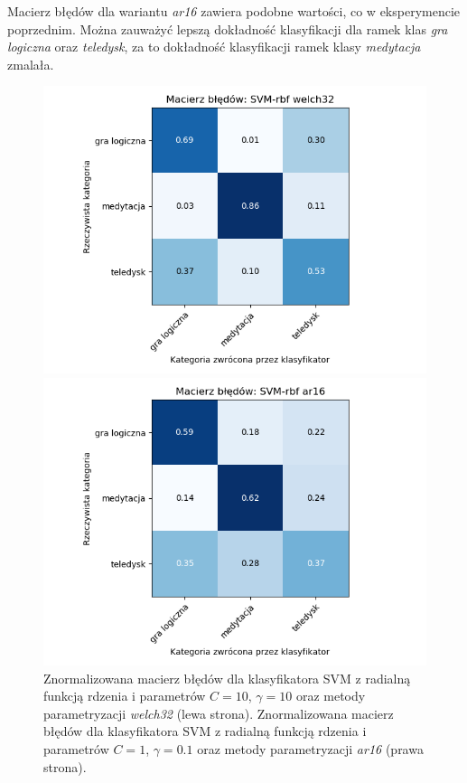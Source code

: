 \documentclass[notitlepage]{report}
\begin{document}
Macierz błędów dla wariantu \textit{ar16} zawiera podobne wartości, co w eksperymencie poprzednim. Można zauważyć lepszą dokładność klasyfikacji dla ramek klas \textit{gra logiczna} oraz \textit{teledysk}, za to dokładność klasyfikacji ramek klasy \textit{medytacja} zmalała.

\begin{figure}[H]
	\begin{minipage}{0.48\textwidth}
		\centering
		\includegraphics[width=1.3\linewidth]{rbf_svm_welch_32_cm.png}
	\end{minipage}
	\begin{minipage}{0.48\textwidth}
		\centering
		\includegraphics[width=1.3\linewidth]{rbf_svm_ar_16_cm.png}
	\end{minipage}
	\caption{Znormalizowana macierz błędów dla klasyfikatora SVM z radialną funkcją rdzenia i parametrów $C=10$, $\gamma=10$ oraz metody parametryzacji \textit{welch32} (lewa strona). Znormalizowana macierz błędów dla klasyfikatora SVM z radialną funkcją rdzenia i parametrów $C=1$, $\gamma=0.1$ oraz metody parametryzacji \textit{ar16}  (prawa strona).}
\end{figure}
\end{document}
